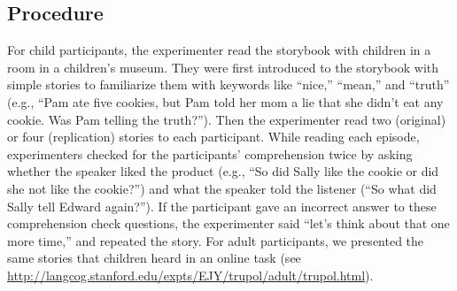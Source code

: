 \documentclass[oneside]{report}
\begin{document}
\subsection{Procedure}\label{procedure-3}

For child participants, the experimenter read the storybook with
children in a room in a children's museum. They were first introduced to
the storybook with simple stories to familiarize them with keywords like
``nice,'' ``mean,'' and ``truth'' (e.g., ``Pam ate five cookies, but Pam
told her mom a lie that she didn't eat any cookie. Was Pam telling the
truth?''). Then the experimenter read two (original) or four
(replication) stories to each participant. While reading each episode,
experimenters checked for the participants' comprehension twice by
asking whether the speaker liked the product (e.g., ``So did Sally like
the cookie or did she not like the cookie?'') and what the speaker told
the listener (``So what did Sally tell Edward again?''). If the
participant gave an incorrect answer to these comprehension check
questions, the experimenter said ``let's think about that one more
time,'' and repeated the story. For adult participants, we presented the
same stories that children heard in an online task (see
\url{http://langcog.stanford.edu/expts/EJY/trupol/adult/trupol.html}).
\end{document}
